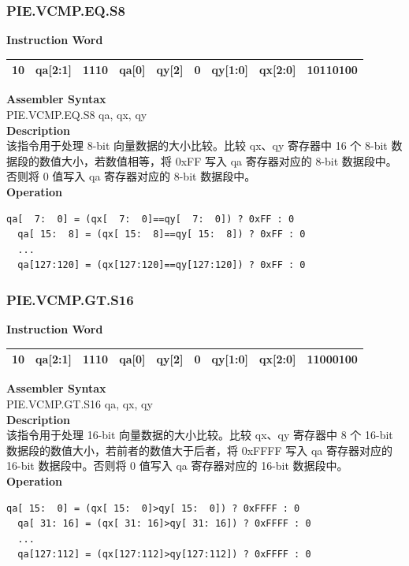 \newpage
\subsubsection{PIE.VCMP.EQ.S8}\label{instruction:PIEVCMPEQS8}
\setlength\tabcolsep{6pt}
\textbf{Instruction Word} \\
\begin{tabular}{|c|c|c|c|c|c|c|c|c|}
	\hline
	10 & qa[2:1] & 1110 & qa[0] & qy[2] & 0 & qy[1:0] & qx[2:0] & 10110100 \\
	\hline
\end{tabular}

\textbf{Assembler Syntax} \\
PIE.VCMP.EQ.S8 qa, qx, qy \\
\textbf{Description} \\
该指令用于处理 8-bit 向量数据的大小比较。比较 qx、qy 寄存器中 16 个 8-bit 数据段的数值大小，若数值相等，将 0xFF 写入 qa 寄存器对应的 8-bit 数据段中。否则将 0 值写入 qa 寄存器对应的 8-bit 数据段中。\\
\textbf{Operation}
\begin{lstlisting}[escapeinside=`?]
  qa[  7:  0] = (qx[  7:  0]==qy[  7:  0]) ? 0xFF : 0
  qa[ 15:  8] = (qx[ 15:  8]==qy[ 15:  8]) ? 0xFF : 0
  ...
  qa[127:120] = (qx[127:120]==qy[127:120]) ? 0xFF : 0
\end{lstlisting}

\newpage
\subsubsection{PIE.VCMP.GT.S16}\label{instruction:PIEVCMPGTS16}
\setlength\tabcolsep{6pt}
\textbf{Instruction Word} \\
\begin{tabular}{|c|c|c|c|c|c|c|c|c|}
	\hline
	10 & qa[2:1] & 1110 & qa[0] & qy[2] & 0 & qy[1:0] & qx[2:0] & 11000100 \\
	\hline
\end{tabular}

\textbf{Assembler Syntax} \\
PIE.VCMP.GT.S16 qa, qx, qy \\
\textbf{Description} \\
该指令用于处理 16-bit 向量数据的大小比较。比较 qx、qy 寄存器中 8 个 16-bit 数据段的数值大小，若前者的数值大于后者，将 0xFFFF 写入 qa 寄存器对应的 16-bit 数据段中。否则将 0 值写入 qa 寄存器对应的 16-bit 数据段中。\\
\textbf{Operation}
\begin{lstlisting}[escapeinside=`?]
  qa[ 15:  0] = (qx[ 15:  0]>qy[ 15:  0]) ? 0xFFFF : 0
  qa[ 31: 16] = (qx[ 31: 16]>qy[ 31: 16]) ? 0xFFFF : 0
  ...
  qa[127:112] = (qx[127:112]>qy[127:112]) ? 0xFFFF : 0
\end{lstlisting}

